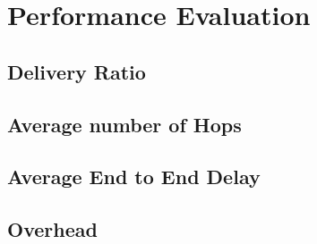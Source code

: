 \chapter{Performance Evaluation}
\section{Delivery Ratio}
\section{Average number of Hops}
\section{Average End to End Delay}
\section{Overhead}
